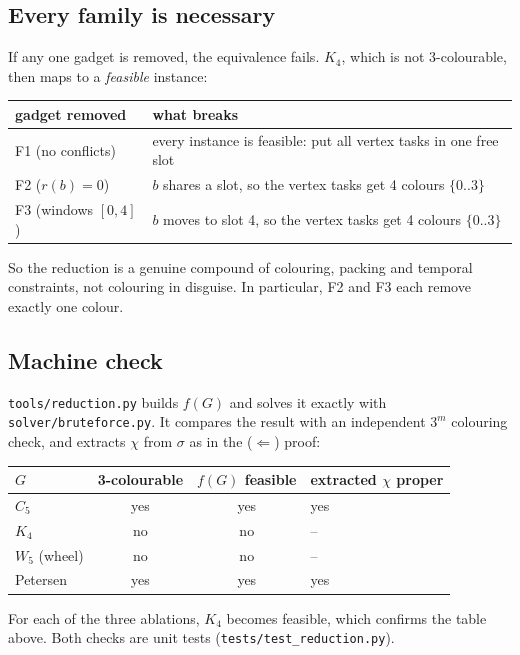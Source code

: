 \subsection{Every family is necessary}
If any one gadget is removed, the equivalence fails. $K_4$, which is not
3-colourable, then maps to a \emph{feasible} instance:
\begin{center}\small
\begin{tabular}{l l}
\toprule
gadget removed & what breaks\\
\midrule
F1 (no conflicts) & every instance is feasible: put all vertex tasks in one free slot\\
F2 ($r(b)=0$) & $b$ shares a slot, so the vertex tasks get 4 colours $\{0..3\}$\\
F3 (windows $[0,4]$) & $b$ moves to slot 4, so the vertex tasks get 4 colours $\{0..3\}$\\
\bottomrule
\end{tabular}
\end{center}
So the reduction is a genuine compound of colouring, packing and temporal
constraints, not colouring in disguise. In particular, F2 and F3 each
remove exactly one colour.

\subsection{Machine check}
\texttt{tools/reduction.py} builds $f(G)$ and solves it exactly with
\texttt{solver/bruteforce.py}. It compares the result with an independent
$3^m$ colouring check, and extracts $\chi$ from $\sigma$ as in the
($\Leftarrow$) proof:
\begin{center}\small
\begin{tabular}{l c c l}
\toprule
$G$ & 3-colourable & $f(G)$ feasible & extracted $\chi$ proper\\
\midrule
$C_5$ & yes & yes & yes\\
$K_4$ & no & no & --\\
$W_5$ (wheel) & no & no & --\\
Petersen & yes & yes & yes\\
\bottomrule
\end{tabular}
\end{center}
For each of the three ablations, $K_4$ becomes feasible, which confirms the
table above. Both checks are unit tests (\texttt{tests/test\_reduction.py}).
